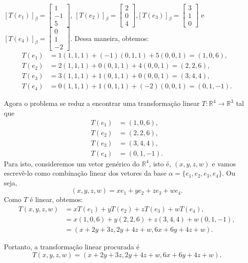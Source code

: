 \begin{enumerate}
$[T(e_1)]_{\beta}=\left[ \begin{array}{c}1 \\-1\\ 5\end{array} \right]$, $[T(e_2)]_{\beta}=\left[ \begin{array}{c}2 \\0\\ 4\end{array} \right]$,$[T(e_3)]_{\beta}=\left[ \begin{array}{c}3\\1\\ 0\end{array} \right]$ e $[T(e_4)]_{\beta}=\left[ \begin{array}{c}0 \\1\\ -2\end{array} \right]$.
Dessa maneira, obtemos:
\begin{align*}
T(e_1)&=1(1, 1, 1)+(-1)(0,1,1)+5(0,0,1)=(1,0,6), \\
T(e_2)&=2(1, 1, 1)+0(0,1,1)+4(0,0,1)=(2,2,6), \\
T(e_3)&=3(1, 1, 1)+1(0,1,1)+0(0,0,1)=(3,4,4), \\
T(e_4)&=0(1, 1, 1)+1(0,1,1)+(-2)(0,0,1)=(0,1,-1).
\end{align*}

Agora o problema se reduz a encontrar uma transformação linear $T: \mathbb{R}^4 \rightarrow \mathbb{R}^3$ tal que
 \begin{align*}
T(e_1)&=(1,0,6), \\
T(e_2)&=(2,2,6), \\
T(e_3)&=(3,4,4), \\
T(e_4)&=(0,1,-1).
\end{align*}
Para isto, consideremos um vetor genérico do $ \mathbb{R}^4$, isto é, $(x,y,z,w)$ e vamos escrevê-lo como combinação linear dos vetores da base $\alpha =\{e_1, e_2, e_3, e_4\}$. Ou seja, $$(x,y,z,w)= xe_1+ y e_2+z e_3+ we_4.$$
Como $T$ é linear, obtemos:
\begin{align*}
T(x,y,z,w)&= xT(e_1)+ y T(e_2)+z T(e_3)+ wT(e_4),\\
                &= x(1,0,6)+ y (2,2,6)+z (3,4,4)+ w(0,1,-1),\\
               &=(x+2y+3z, 2y+4z+w,6x+6y+4z+w).
\end{align*}

Portanto, a transformação linear procurada é  $$T(x,y,z,w)=(x+2y+3z, 2y+4z+w,6x+6y+4z+w).$$



\end{enumerate}
